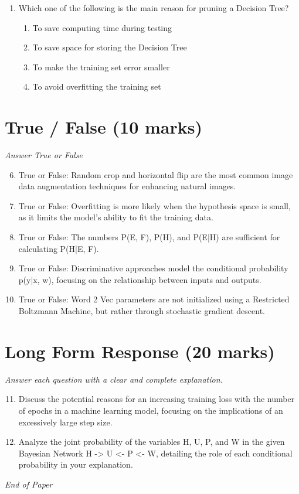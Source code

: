 \documentclass[12pt]{article}
\begin{document}
\begin{enumerate}[label=\arabic*.]
\begin{enumerate}[label=(\alph*)]
    \item False, True
\end{enumerate}
\item Which one of the following is the main reason for pruning a Decision Tree?
\begin{enumerate}[label=(\alph*)]
    \item To save computing time during testing
    \item To save space for storing the Decision Tree
    \item To make the training set error smaller
    \item To avoid overfitting the training set
\end{enumerate}
\end{enumerate}

\section*{True / False (10 marks)}
\textit{Answer True or False}
\begin{enumerate}[label=\arabic*.]
\setcounter{enumi}{5}
\item True or False: Random crop and horizontal flip are the most common image data augmentation techniques for enhancing natural images.
\item True or False: Overfitting is more likely when the hypothesis space is small, as it limits the model's ability to fit the training data.
\item True or False: The numbers P(E, F), P(H), and P(E|H) are sufficient for calculating P(H|E, F).
\item True or False: Discriminative approaches model the conditional probability p(y|x, w), focusing on the relationship between inputs and outputs.
\item True or False: Word 2 Vec parameters are not initialized using a Restricted Boltzmann Machine, but rather through stochastic gradient descent.
\end{enumerate}

\section*{Long Form Response (20 marks)}
\textit{Answer each question with a clear and complete explanation.}
\begin{enumerate}[label=\arabic*.]
\setcounter{enumi}{10}
\item Discuss the potential reasons for an increasing training loss with the number of epochs in a machine learning model, focusing on the implications of an excessively large step size.
\item Analyze the joint probability of the variables H, U, P, and W in the given Bayesian Network H -\textgreater{} U \textless{}- P \textless{}- W, detailing the role of each conditional probability in your explanation.
\end{enumerate}

\vfill
\noindent\textit{End of Paper}
\end{document}
